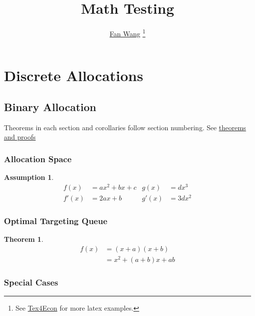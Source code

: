 \documentclass[12pt,english]{article}
\newtheorem{theorem}{Theorem}[section]
\newtheorem{assumption}{Assumption}[section]
\begin{document}
\title{Math Testing}
\author{\href{http://fanwangecon.github.io/}{Fan Wang} \thanks{See \href{https://fanwangecon.github.io/Tex4Econ/}{Tex4Econ} for more latex examples.}}

\maketitle

\section{Discrete Allocations}

\subsection{Binary Allocation}

Theorems in each section and corollaries follow section numbering. See \href{https://www.overleaf.com/learn/latex/Theorems_and_proofs}{theorems and proofs}

\subsubsection{Allocation Space}

\begin{assumption}
    \label{as:1a}
    \begin{align}
         f(x)  &= a x^2+b x +c   &   g(x)  &= d x^3 \\
         f'(x) &= 2 a x +b       &   g'(x) &= 3 d x^2
    \end{align}
    \end{assumption}
    
\blindtext

\subsubsection{Optimal Targeting Queue}

\begin{theorem}
\label{thm:1a}
\blindtext
\begin{align}
    f(x) &= (x+a)(x+b) \\
         &= x^2 + (a+b)x + ab
\end{align}
\blindtext
\end{theorem}

\blindtext

\subsubsection{Special Cases}
\end{document}
